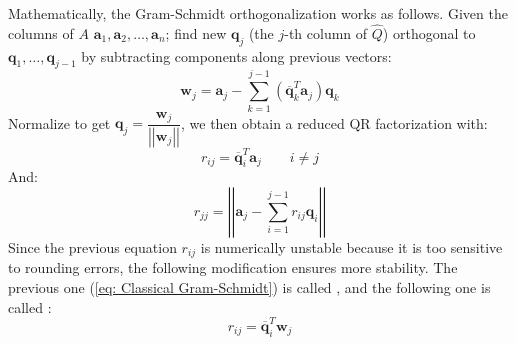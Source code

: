 \highspace
Mathematically, the Gram-Schmidt orthogonalization works as follows. Given the columns of $A$ $\mathbf{a}_{1}, \mathbf{a}_{2}, \dots, \mathbf{a}_{n}$; find new $\mathbf{q}_{j}$ (the $j$-th column of $\widehat{Q}$) orthogonal to $\mathbf{q}_{1}, \dots, \mathbf{q}_{j-1}$ by subtracting components along previous vectors:
\begin{equation*}
    \mathbf{w}_{j} = \mathbf{a}_{j} - \displaystyle\sum_{k=1}^{j-1} \left(\overline{\mathbf{q}}_{k}^{T}\mathbf{a}_{j}\right)\mathbf{q}_{k}
\end{equation*}
Normalize to get $\mathbf{q}_{j} = \dfrac{\mathbf{w}_{j}}{\left|\left|\mathbf{w}_{j}\right|\right|}$, we then obtain a reduced QR factorization with:
\begin{equation}\label{eq: Classical Gram-Schmidt}
    r_{ij} = \overline{\mathbf{q}}_{i}^{T}\mathbf{a}_{j} \hspace{2em} i \ne j
\end{equation}
And:
\begin{equation*}
    r_{jj} = \left|\left|\mathbf{a}_{j} - \displaystyle\sum_{i=1}^{j-1} r_{ij}\mathbf{q}_{i}\right|\right|
\end{equation*}
Since the previous equation $r_{ij}$ is numerically unstable because it is too sensitive to rounding errors, the following modification ensures more stability. The previous one (\ref{eq: Classical Gram-Schmidt}) is called , and the following one is called :
\begin{equation}\label{eq: Modified Gram-Schmidt}
    r_{ij} = \overline{\mathbf{q}}_{i}^{T}\mathbf{w}_{j}
\end{equation}